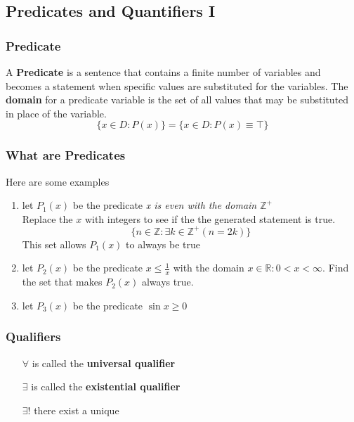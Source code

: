 \documentclass[12pt]{book}
\newcommand{\T}[0]{\top}
\begin{document}
\subsection{Predicates and Quantifiers I}
\subsubsection{Predicate}
    A \textbf{Predicate} is a sentence that contains a finite number of variables and becomes a statement when specific values are substituted for the variables. The \textbf{domain} for a predicate variable is the set of all values that may be substituted in place of the variable. 
    \[
    \{ x\in D: P(x) \} = \{ x\in D: P(x) \equiv \T \}
    \]
\subsubsection{What are Predicates}
    Here are some examples\\
    \begin{enumerate}
        \item let $P_1(x)$ be the predicate \textit{x is even with the domain $\mathbb{Z}^+$}\\
        Replace the $x$ with integers to see if the the generated statement is true.
        \[
        \{ n\in \mathbb{Z} : \exists k \in \mathbb{Z}^+ (n=2k) \}
        \]
        This set allows $P_1(x)$ to always be true\\
        \item let $P_2(x)$ be the predicate $x \leq \frac{1}{x}$ with the domain ${x\in \mathbb{R}: 0 < x < \infty}$. Find the set that makes $P_2(x)$ always true.\\
        \item let $P_3(x)$ be the predicate $\sin x \geq 0$
    \end{enumerate}
    
\subsubsection{Qualifiers}

\begin{enumerate}
    \item[$\forall$] is called the \textbf{universal qualifier}
    \item[$\exists$] is called the \textbf{existential qualifier}
    \item[$\exists !$] there exist a unique
\end{enumerate}
\end{document}
